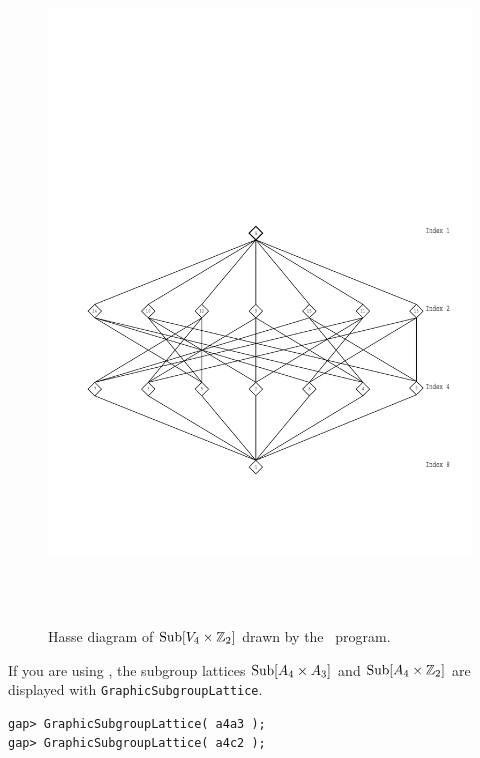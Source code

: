 \begin{enumerate}
\begin{figure}[h!]
\begin{center}
\includegraphics[height=18cm]{v4c2new.pdf}%
\caption{Hasse diagram of $\operatorname{Sub}[V_4 \times \mathbb{Z}_2]$ drawn by the \xgap\ program.}
\label{fig:v4c2}
\end{center}\end{figure}
\noindent If you are using \xgap, the subgroup lattices 
$\operatorname{Sub}[A_4 \times A_3]$ and $\operatorname{Sub}[A_4 \times \mathbb{Z}_2]$ are displayed with
{\tt GraphicSubgroupLattice}.  
{\codesize
\begin{verbatim}
gap> GraphicSubgroupLattice( a4a3 );
gap> GraphicSubgroupLattice( a4c2 );

\end{verbatim}}


\end{enumerate}
